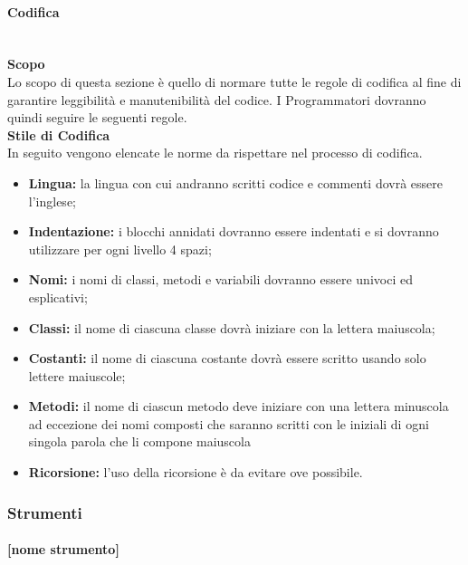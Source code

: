 \paragraph{Codifica} \mbox{}
\\\textbf{Scopo}\\
Lo scopo di questa sezione è quello di normare tutte le regole di codifica al fine di garantire leggibilità e manutenibilità del codice. I Programmatori dovranno quindi seguire le seguenti regole.
\\\textbf{Stile di Codifica}\\
In seguito vengono elencate le norme da rispettare nel processo di codifica.
\begin{itemize}
	\item \textbf{Lingua:} la lingua con cui andranno scritti codice e commenti dovrà essere l'inglese;
	\item \textbf{Indentazione:} i blocchi annidati dovranno essere indentati e si dovranno utilizzare per ogni livello 4 spazi;
	\item \textbf{Nomi:} i nomi di classi, metodi e variabili dovranno essere univoci ed esplicativi;
	\item \textbf{Classi:} il nome di ciascuna classe dovrà iniziare con la lettera maiuscola; 
	\item \textbf{Costanti:} il nome di ciascuna costante dovrà essere scritto usando solo lettere maiuscole;
	\item \textbf{Metodi:} il nome di ciascun metodo deve iniziare con una lettera minuscola ad eccezione dei nomi composti che saranno scritti con le iniziali di ogni singola parola che li compone maiuscola 
	\item \textbf{Ricorsione:} l'uso della ricorsione è da evitare ove possibile.	
\end{itemize}
\subsubsection{Strumenti}
\paragraph{[nome strumento]}